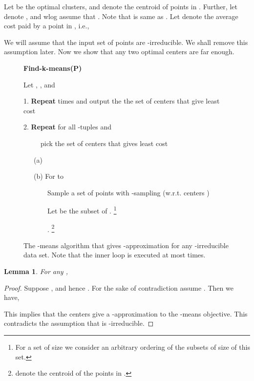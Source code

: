 \documentclass[a4paper]{article}
\newtheorem{lemma}[theorem]{Lemma}
\begin{document}
Let  be the optimal clusters, and  denote the centroid  of points in . Further, let  denote ,
and wlog assume that . Note that  is same as
.
 Let  denote the average cost paid by a point in , i.e.,

We will assume that the input set of points  are
-irreducible. We shall remove this assumption later. Now we show that any two optimal centers are far enough.

\begin{center}
\begin{figure}
\begin{boxedminipage}{5in}
{\bf Find-k-means(P)}

\hspace{0.1in} Let , , and 

\hspace{0.1in} 1. {\bf Repeat}  times and output the the set of centers  that give least cost

\hspace{0.3in} 2. {\bf Repeat} for all -tuples  and

\hspace{0.3in} \ \ \ \ \ pick the set of centers  that gives least cost

\hspace{0.5in} \ \ \ (a) 

\hspace{0.5in} \ \ \ (b) For  to 

\hspace{0.7in}\ \ \ \ \  \ \ Sample a set  of  points with -sampling (w.r.t. centers )

\hspace{0.7in} \ \ \ \ \ \ \ Let  be the  subset of . \footnote{For a set of size  we consider an arbitrary ordering of the subsets of size  of this set.}


\hspace{0.7in} \ \ \ \ \ \ \ . \footnote{ denote the centroid of the points in .}

\end{boxedminipage}
\caption{The -means algorithm that gives -approximation for any -irreducible data set. Note that the inner loop is executed at most 
 times. }
\label{fig:k}
\end{figure}
\end{center}
\vspace*{-0.5in}

\begin{lemma}
\label{lem:min}
For any ,

\end{lemma}
\begin{proof}
Suppose , and hence .
For the sake of contradiction assume . Then we have,

This implies that the centers  give a -approximation to the
-means objective. This contradicts the assumption that  is -irreducible.
\end{proof}
\end{document}
